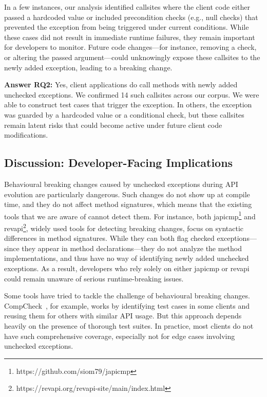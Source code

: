In a few instances, our analysis identified callsites where the client code either passed a hardcoded value or included precondition checks (e.g., null checks) that prevented the exception from being triggered under current conditions. While these cases did not result in immediate runtime failures, they remain important for developers to monitor. Future code changes—for instance, removing a check, or altering the passed argument—could unknowingly expose these callsites to the newly added exception, leading to a breaking change.

\vspace{1em}
\begin{tcolorbox}[colback=gray!10, colframe=black]
\textbf{Answer RQ2:} Yes, client applications do call methods with newly added unchecked exceptions. We confirmed 14 such callsites across our corpus. We were able to construct test cases that trigger the exception. In others, the exception was guarded by a hardcoded value or a conditional check, but these callsites remain latent risks that could become active under future client code modifications.
\end{tcolorbox}
\vspace{1em}

\subsection{Discussion: Developer-Facing Implications}

Behavioural breaking changes caused by unchecked exceptions during API evolution are particularly dangerous. Such changes do not show up at compile time, and they do not affect method signatures, which means that the existing tools that we are aware of cannot detect them. For instance, both japicmp\footnote{https://github.com/siom79/japicmp} and revapi\footnote{https://revapi.org/revapi-site/main/index.html}, widely used tools for detecting breaking changes, focus on syntactic differences in method signatures. While they can both flag checked exceptions—since they appear in method declarations—they do not analyze the method implementations, and thus have no way of identifying newly added unchecked exceptions. As a result, developers who rely solely on either japicmp or revapi could remain unaware of serious runtime-breaking issues.

Some tools have tried to tackle the challenge of behavioural breaking changes. CompCheck~\cite{CompCheck}, for example, works by identifying test cases in some clients and reusing them for others with similar API usage. But this approach depends heavily on the presence of thorough test suites. In practice, most clients do not have such comprehensive coverage, especially not for edge cases involving unchecked exceptions.

